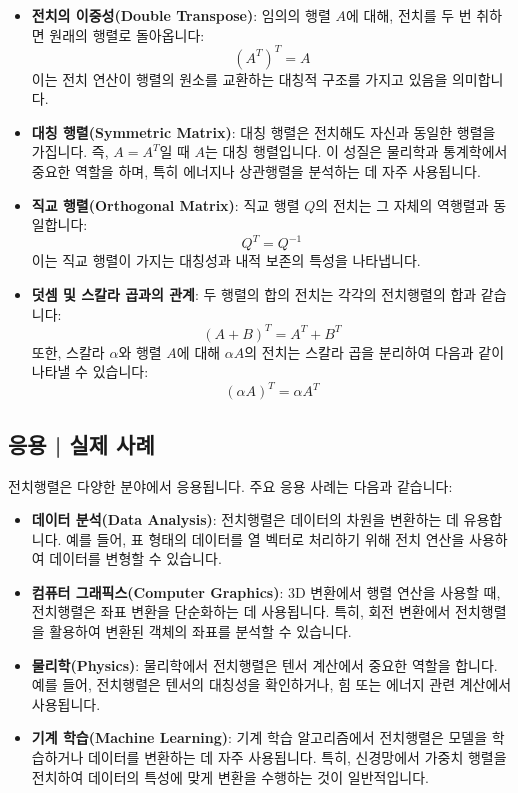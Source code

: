 \begin{itemize}
  \item \textbf{전치의 이중성(Double Transpose)}: 임의의 행렬 \( A \)에 대해, 전치를 두 번 취하면 원래의 행렬로 돌아옵니다:
        \[
          (A^T)^T = A
        \]
        이는 전치 연산이 행렬의 원소를 교환하는 대칭적 구조를 가지고 있음을 의미합니다.

  \item \textbf{대칭 행렬(Symmetric Matrix)}: 대칭 행렬은 전치해도 자신과 동일한 행렬을 가집니다. 즉, \( A = A^T \)일 때 \( A \)는 대칭 행렬입니다. 이 성질은 물리학과 통계학에서 중요한 역할을 하며, 특히 에너지나 상관행렬을 분석하는 데 자주 사용됩니다.

  \item \textbf{직교 행렬(Orthogonal Matrix)}: 직교 행렬 \( Q \)의 전치는 그 자체의 역행렬과 동일합니다:
        \[
          Q^T = Q^{-1}
        \]
        이는 직교 행렬이 가지는 대칭성과 내적 보존의 특성을 나타냅니다.

  \item \textbf{덧셈 및 스칼라 곱과의 관계}: 두 행렬의 합의 전치는 각각의 전치행렬의 합과 같습니다:
        \[
          (A + B)^T = A^T + B^T
        \]
        또한, 스칼라 \( \alpha \)와 행렬 \( A \)에 대해 \( \alpha A \)의 전치는 스칼라 곱을 분리하여 다음과 같이 나타낼 수 있습니다:
        \[
          (\alpha A)^T = \alpha A^T
        \]
\end{itemize}

\subsection{응용 | 실제 사례}
전치행렬은 다양한 분야에서 응용됩니다. 주요 응용 사례는 다음과 같습니다:

\begin{itemize}
  \item \textbf{데이터 분석(Data Analysis)}: 전치행렬은 데이터의 차원을 변환하는 데 유용합니다. 예를 들어, 표 형태의 데이터를 열 벡터로 처리하기 위해 전치 연산을 사용하여 데이터를 변형할 수 있습니다.

  \item \textbf{컴퓨터 그래픽스(Computer Graphics)}: 3D 변환에서 행렬 연산을 사용할 때, 전치행렬은 좌표 변환을 단순화하는 데 사용됩니다. 특히, 회전 변환에서 전치행렬을 활용하여 변환된 객체의 좌표를 분석할 수 있습니다.

  \item \textbf{물리학(Physics)}: 물리학에서 전치행렬은 텐서 계산에서 중요한 역할을 합니다. 예를 들어, 전치행렬은 텐서의 대칭성을 확인하거나, 힘 또는 에너지 관련 계산에서 사용됩니다.

  \item \textbf{기계 학습(Machine Learning)}: 기계 학습 알고리즘에서 전치행렬은 모델을 학습하거나 데이터를 변환하는 데 자주 사용됩니다. 특히, 신경망에서 가중치 행렬을 전치하여 데이터의 특성에 맞게 변환을 수행하는 것이 일반적입니다.
\end{itemize}

